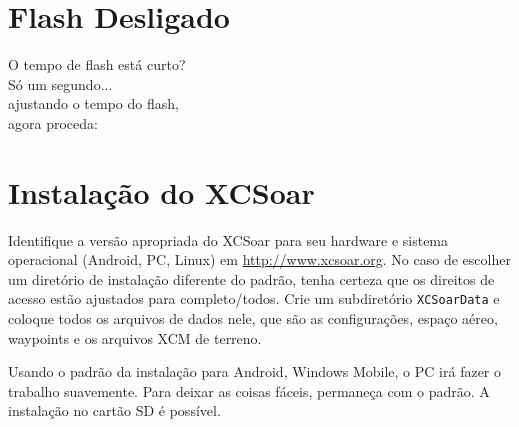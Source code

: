 \documentclass[a4paper,12pt]{refrep}
\begin{document}
\section*{{\color[rgb]{.9,.85,0}Flash} Desligado}

\vspace{2em}
\hspace*{1cm} O tempo de flash está curto?\\
\hspace*{4cm} Só um segundo...\\
\hspace*{6cm} ajustando o tempo do flash,\\
\hspace*{10cm} agora proceda: 


\setlength{\parskip}{0.3\baselineskip}
\newpage
\section{Instalação do XCSoar }\label{ch:XCSinstall}


Identifique a versão apropriada do XCSoar para seu hardware e sistema operacional \textsf{(Android, PC, Linux)}
em \url{http://www.xcsoar.org}.
No caso de escolher um diretório de instalação diferente do padrão, tenha certeza que os direitos de acesso estão ajustados para completo/todos.  Crie um subdiretório \texttt{XCSoarData} e coloque todos os arquivos de dados nele, que são as configurações, espaço aéreo, waypoints e os arquivos XCM de terreno.

Usando o padrão da instalação para Android, Windows Mobile, o PC irá fazer o trabalho suavemente.  Para deixar as coisas fáceis, permaneça com o padrão.  A instalação no cartão SD é possível.
\end{document}

